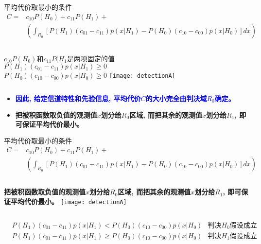 \begin{frame}[shrink]{平均代价取最小的条件}
\begin{align*}
C=&c_{10}P(H_0)+c_{11}P(H_1)+\\
&\left(\int_{R_0}\left[P({H_1})(c_{01}-c_{11})p(x|H_1)-P(H_0)(c_{10}-c_{00})p(x|H_0)\right]dx \right)
\end{align*}
\begin{columns}
	$c_{10}P(H_0)$和$c_{11}P(H_1$是两项固定的值\\
	$P({H_1})(c_{01}-c_{11})p(x|H_1)\ge 0$\\
	$P(H_0)(c_{10}-c_{00})p(x|H_0)\ge 0$
	\texttt{[image: detectionA]}
\end{columns}
\begin{itemize}
	\item \textcolor{blue}{\textbf{因此, 给定信道特性和先验信息, 平均代价$C$的大小完全由判决域$R_0$确定。}}
	\item \textbf{把被积函数取负值的观测值$x$划分给$R_0$区域, 而把其余的观测值$x$划分给$R_1$, 即可保证平均代价最小。}
\end{itemize}
\end{frame}

\begin{frame}[shrink]{平均代价取最小的条件}
\begin{align*}
C=&c_{10}P(H_0)+c_{11}P(H_1)+\\
&\left(\int_{R_0}\left[P({H_1})(c_{01}-c_{11})p(x|H_1)-P(H_0)(c_{10}-c_{00})p(x|H_0)\right]dx \right)
\end{align*}
\begin{columns}
	\textbf{把被积函数取负值的观测值$x$划分给$R_0$区域, 而把其余的观测值$x$划分给$R_1$, 即可保证平均代价最小。}
	\texttt{[image: detectionA]}
\end{columns}
\begin{align*}
&P({H_1})(c_{01}-c_{11})p(x|H_1)< P(H_0)(c_{10}-c_{00})p(x|H_0)&\textbf{判决$H_0$假设成立}\\
&P({H_1})(c_{01}-c_{11})p(x|H_1)\ge P(H_0)(c_{10}-c_{00})p(x|H_0)&\textbf{判决$H_1$假设成立}
\end{align*}
\end{frame}

